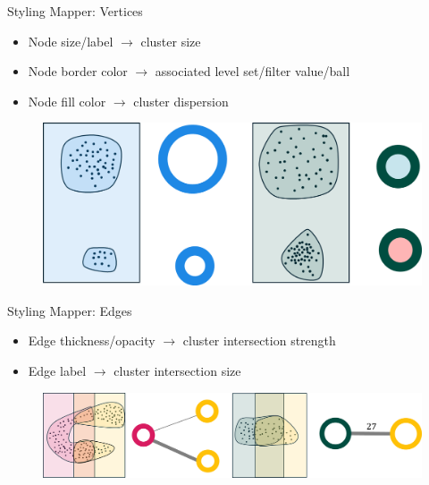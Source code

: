 \documentclass{beamer}
\begin{document}
\begin{frame}{Styling Mapper: Vertices}
  \begin{itemize}
    \item Node size/label $\to$ cluster size
    \item Node border color $\to$ associated level set/filter value/ball
    \item Node fill color $\to$ cluster dispersion
  \end{itemize}
  \begin{figure}
    \begin{center}
      \includegraphics[width=1\textwidth]{nodestyling.png}
    \end{center}
  \end{figure}
\end{frame}

\begin{frame}{Styling Mapper: Edges}
  \begin{itemize}
    \item Edge thickness/opacity $\to$ cluster intersection strength
    \item Edge label $\to$ cluster intersection size
  \end{itemize}
  \begin{figure}
    \begin{center}
      \includegraphics[width=1.05\textwidth]{edgestyling.png}
    \end{center}
  \end{figure}
\end{frame}
\end{document}
